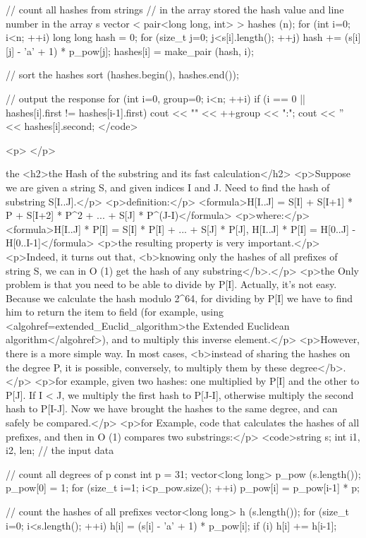 // count all hashes from strings
// in the array stored the hash value and line number in the array s
vector < pair<long long, int> > hashes (n);
for (int i=0; i<n; ++i)
{
long long hash = 0;
for (size_t j=0; j<s[i].length(); ++j)
hash += (s[i][j] - 'a' + 1) * p_pow[j];
hashes[i] = make_pair (hash, i);
}

// sort the hashes
sort (hashes.begin(), hashes.end());

// output the response
for (int i=0, group=0; i<n; ++i)
{
if (i == 0 || hashes[i].first != hashes[i-1].first)
cout << "\nGroup " << ++group << ":";
cout << '' << hashes[i].second;
}</code>

<p> </p>

the <h2>the Hash of the substring and its fast calculation</h2>
<p>Suppose we are given a string S, and given indices I and J. Need to find the hash of substring S[I..J].</p>
<p>definition:</p>
<formula>H[I..J] = S[I] + S[I+1] * P + S[I+2] * P^2 + ... + S[J] * P^(J-I)</formula>
<p>where:</p>
<formula>H[I..J] * P[I] = S[I] * P[I] + ... + S[J] * P[J],
H[I..J] * P[I] = H[0..J] - H[0..I-1]</formula>
<p>the resulting property is very important.</p>
<p>Indeed, it turns out that, <b>knowing only the hashes of all prefixes of string S, we can in O (1) get the hash of any substring</b>.</p>
<p>the Only problem is that you need to be able to divide by P[I]. Actually, it's not easy. Because we calculate the hash modulo 2^64, for dividing by P[I] we have to find him to return the item to field (for example, using <algohref=extended_Euclid_algorithm>the Extended Euclidean algorithm</algohref>), and to multiply this inverse element.</p>
<p>However, there is a more simple way. In most cases, <b>instead of sharing the hashes on the degree P, it is possible, conversely, to multiply them by these degree</b>.</p>
<p>for example, given two hashes: one multiplied by P[I] and the other to P[J]. If I < J, we multiply the first hash to P[J-I], otherwise multiply the second hash to P[I-J]. Now we have brought the hashes to the same degree, and can safely be compared.</p>
<p>for Example, code that calculates the hashes of all prefixes, and then in O (1) compares two substrings:</p>
<code>string s; int i1, i2, len; // the input data

// count all degrees of p
const int p = 31;
vector<long long> p_pow (s.length());
p_pow[0] = 1;
for (size_t i=1; i<p_pow.size(); ++i)
p_pow[i] = p_pow[i-1] * p;

// count the hashes of all prefixes
vector<long long> h (s.length());
for (size_t i=0; i<s.length(); ++i)
{
h[i] = (s[i] - 'a' + 1) * p_pow[i];
if (i) h[i] += h[i-1];
}

